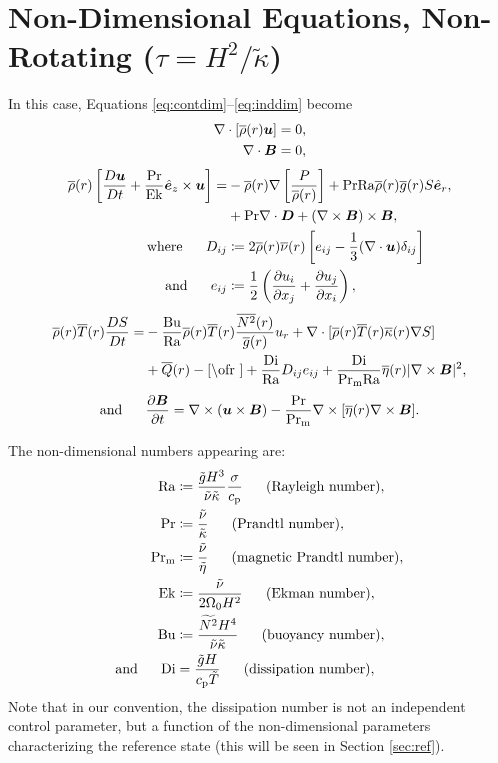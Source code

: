 \documentclass[12pt]{article}
\numberwithin{equation}{section}
\begin{document}
	\section{Non-Dimensional Equations, Non-Rotating ($\tau=H^2/\tilde{\kappa}$)}
	In this case, Equations \eqref{eq:contdim}--\eqref{eq:inddim} become 
	\begin{align}
	\nabla\cdot[\overline{\rho}(r)\bm{u}] &= 0\label{eq:contndvisc},\\
	\nabla\cdot \bm{B} &= 0,
\end{align}
\begin{subequations}\label{eq:momndvisc}
	\begin{align}
		\overline{\rho}(r)\left[\frac{D\bm{u}}{Dt}+\frac{{\rm{Pr}}}{{\rm{Ek}}}\hat{\bm{e}}_z\times\bm{u}\right] = &-\overline{\rho}(r)\nabla\left[ \frac{P}{\overline{\rho}(r)} \right] + {\rm{Pr}}{\rm{Ra}}\overline{\rho}(r)\overline{g}(r) S\hat{\bm{e}}_r, \nonumber\\
		&+{\rm{Pr}}\nabla\cdot\bm{D} +(\nabla\times\bm{B})\times\bm{B},\\
		\text{where}\ \ \ \ \  D_{ij} &\coloneqq 2\overline{\rho}(r)\overline{\nu}(r) \left[e_{ij} - \frac{1}{3}(\nabla\cdot\bm{u}) \delta_{ij} \right]\\
		\text{and}\ \ \ \ \  e_{ij} &\coloneqq \frac{1}{2}\left(\frac{\partial u_i}{\partial x_j} + \frac{\partial u_j}{\partial x_i} \right),
	\end{align}
\end{subequations}
\begin{align}\label{eq:enndvisc}
	\rhoref\ofr\tmpref\ofr \matderiv{S} = &- \frac{\bu}{\ra}\rhoref\ofr\tmpref\ofr \frac{\nsqref\ofr}{\gref\ofr} u_r + \Div[\rhoref\ofr \tmpref\ofr \kapparef\ofr \nabla S] \nonumber \\
	&+ \qref(r) -\cref\ofr + \frac{\di}{\ra} D_{ij}e_{ij} + \frac{\di}{\prm\ra} \etaref\ofr|\curl\vecb|^2,
\end{align}
\begin{align}\label{eq:indndvisc}
	\text{and}\ \ \ \ \  \frac{\partial\bm{B}}{\partial t} = \nabla\times(\bm{u}\times\bm{B}) - \frac{{\rm{Pr}}}{{\rm{Pr_m}}} \nabla\times[\overline{\eta}(r)\nabla\times\bm{B}].
\end{align}	

The non-dimensional numbers appearing are:
\begin{subequations}
\begin{align}
	{\rm{Ra}} &\coloneqq \frac{\tilde{g} H^3}{\tilde{\nu} \tilde{\kappa}} \frac{\sigma}{c_{\rm{p}}}\ \ \ \ \ \text{(Rayleigh number)},\\ 
	{\rm{Pr}} &\coloneqq \frac{\tilde{\nu}}{\tilde{\kappa}}\ \ \ \ \ \text{(Prandtl number)},\\
	{\rm{Pr_m}} &\coloneqq \frac{\tilde{\nu}}{\tilde{\eta}}\ \ \ \ \ \text{(magnetic Prandtl number)},\\
	{\rm{Ek}} &\coloneqq \frac{\tilde{\nu}}{2\Omega_0H^2}\ \ \ \ \ \text{(Ekman number)},\\	
	{\rm{Bu}} &\coloneqq \frac{\widetilde{N^2}H^4}{\tilde{\nu}\tilde{\kappa}}\ \ \ \ \ \text{(buoyancy number)},\\
	\text{and}\ \ \ \ \  {\rm{Di}} &= \frac{\tilde{g}H}{c_{\rm{p}}\tilde{T}}\ \ \ \ \ \text{(dissipation number)},
\end{align}
\end{subequations}
Note that in our convention, the dissipation number is not an independent control parameter, but a function of the non-dimensional parameters characterizing the reference state (this will be seen in Section \ref{sec:ref}). 
\end{document}
